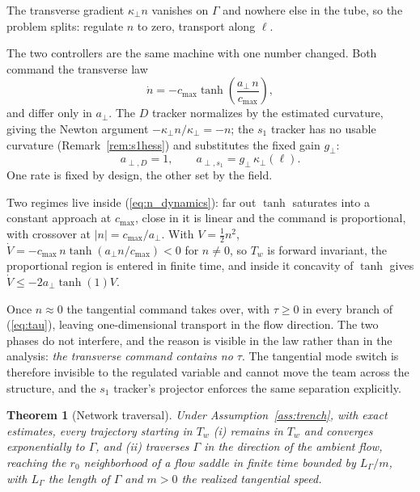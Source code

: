 \documentclass[lettersize,journal]{IEEEtran}
\newtheorem{theorem}{Theorem}
\begin{document}
The transverse gradient $\kappa_\perp n$ vanishes on $\Gamma$ and
nowhere else in the tube, so the problem splits: regulate $n$ to zero,
transport along $\ell$.

The two controllers are the same machine with one number changed. Both
command the transverse law
\begin{equation}
    \dot{n} = -c_{\max}\tanh\!\left(
        \frac{a_\perp\,n}{c_{\max}}\right),
    \label{eq:n_dynamics}
\end{equation}
and differ only in $a_\perp$. The $D$ tracker normalizes by the
estimated curvature, giving the Newton argument $-\kappa_\perp
n/\kappa_\perp = -n$; the $s_1$ tracker has no usable curvature
(Remark~\ref{rem:s1hess}) and substitutes the fixed gain $g_\perp$:
\begin{equation}
    a_{\perp,D} = 1,
    \qquad
    a_{\perp,s_1} = g_\perp\,\kappa_\perp(\ell).
    \label{eq:transverse_rates}
\end{equation}
One rate is fixed by design, the other set by the field.

Two regimes live inside (\ref{eq:n_dynamics}): far out $\tanh$ saturates
into a constant approach at $c_{\max}$, close in it is linear and the
command is proportional, with crossover at $|n| = c_{\max}/a_\perp$.
With $V = \tfrac{1}{2}n^2$, $\dot{V} = -c_{\max}\,n\tanh(a_\perp
n/c_{\max}) < 0$ for $n \neq 0$, so $T_w$ is forward invariant, the
proportional region is entered in finite time, and inside it concavity
of $\tanh$ gives $\dot{V} \leq -2a_\perp\tanh(1)V$.

Once $n \approx 0$ the tangential command takes over, with $\tau \geq 0$
in every branch of (\ref{eq:tau}), leaving one-dimensional transport in
the flow direction. The two phases do not interfere, and the reason is
visible in the law rather than in the analysis: \emph{the transverse
command contains no $\tau$}. The tangential mode switch is therefore
invisible to the regulated variable and cannot move the team across the
structure, and the $s_1$ tracker's projector enforces the same
separation explicitly.

\begin{theorem}[Network traversal]
\label{thm:separatrix}
Under Assumption~\ref{ass:trench}, with exact estimates, every
trajectory starting in $T_w$ (i) remains in $T_w$ and converges
exponentially to $\Gamma$, and (ii) traverses $\Gamma$ in the direction
of the ambient flow, reaching the $r_0$ neighborhood of a flow saddle in
finite time bounded by $L_\Gamma/m$, with $L_\Gamma$ the length of
$\Gamma$ and $m > 0$ the realized tangential speed.
\end{theorem}
\end{document}
